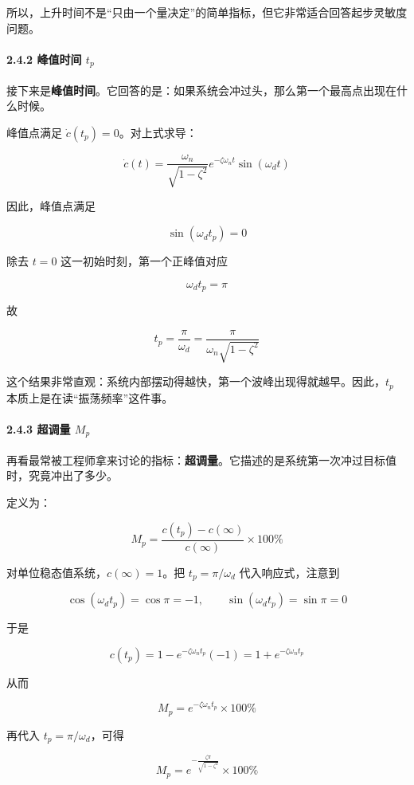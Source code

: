 \documentclass[
  11pt]{article}
\begin{document}
所以，上升时间不是``只由一个量决定''的简单指标，但它非常适合回答起步灵敏度问题。

\paragraph{\texorpdfstring{2.4.2 峰值时间
\(t_p\)}{2.4.2 峰值时间 t\_p}}\label{ux5cf0ux503cux65f6ux95f4-t_p}

接下来是\textbf{峰值时间}。它回答的是：如果系统会冲过头，那么第一个最高点出现在什么时候。

峰值点满足 \(\dot c(t_p)=0\)。对上式求导：

\[
\dot c(t) = \frac{\omega_n}{\sqrt{1-\zeta^2}}e^{-\zeta\omega_n t}\sin(\omega_d t)
\]

因此，峰值点满足

\[
\sin(\omega_d t_p) = 0
\]

除去 \(t=0\) 这一初始时刻，第一个正峰值对应

\[
\omega_d t_p = \pi
\]

故

\[
t_p = \frac{\pi}{\omega_d} = \frac{\pi}{\omega_n\sqrt{1-\zeta^2}}
\]

这个结果非常直观：系统内部摆动得越快，第一个波峰出现得就越早。因此，\(t_p\)
本质上是在读``振荡频率''这件事。

\paragraph{\texorpdfstring{2.4.3 超调量
\(M_p\)}{2.4.3 超调量 M\_p}}\label{ux8d85ux8c03ux91cf-m_p}

再看最常被工程师拿来讨论的指标：\textbf{超调量}。它描述的是系统第一次冲过目标值时，究竟冲出了多少。

定义为：

\[
M_p = \frac{c(t_p)-c(\infty)}{c(\infty)} \times 100\%
\]

对单位稳态值系统，\(c(\infty)=1\)。把 \(t_p=\pi/\omega_d\)
代入响应式，注意到

\[
\cos(\omega_d t_p) = \cos\pi = -1, \qquad \sin(\omega_d t_p) = \sin\pi = 0
\]

于是

\[
c(t_p) = 1 - e^{-\zeta\omega_n t_p}(-1) = 1 + e^{-\zeta\omega_n t_p}
\]

从而

\[
M_p = e^{-\zeta\omega_n t_p} \times 100\%
\]

再代入 \(t_p = \pi/\omega_d\)，可得

\[
M_p = e^{-\frac{\zeta\pi}{\sqrt{1-\zeta^2}}} \times 100\%
\]
\end{document}
